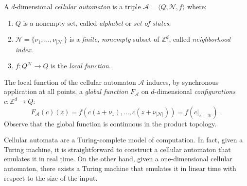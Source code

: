 \documentclass[12pt]{article}
\begin{document}
\newcommand{\Acal}{\ensuremath{\mathcal{A}}}
\newcommand{\Neigh}{\ensuremath{\mathcal{N}}}
\newcommand{\restrict}[2]{\left.{#1}\right|_{#2}}
\newcommand{\Zset}{\ensuremath{\mathbb{Z}}}

A $d$-dimensional \emph{cellular automaton}
is a triple
\begin{math}
\Acal = \langle Q,\Neigh,f \rangle
\end{math}
where:
\begin{enumerate}
\item
$Q$ is a nonempty set, called \emph{alphabet} or \emph{set of states}.
\label{it:ca-states}
\item
\begin{math}
\Neigh = \{ \nu_1, \ldots, \nu_{|\Neigh|} \}
\end{math}
is a \emph{finite, nonempty} subset of $\Zset^d$,
called \emph{neighborhood index}.
\label{it:ca-neigh}
\item
$f : Q^\Neigh \to Q$ is the \emph{local function}.
\label{it:ca-loc}
\end{enumerate}
The local function of the cellular automaton $\Acal$
induces, by synchronous application at all points,
a \emph{global function} $F_\Acal$
on $d$-dimensional \emph{configurations} $c : \Zset^d \to Q$:
\begin{equation} \label{eq:ca-glob}
F_\Acal(c)(z)
= f \left( c(z+\nu_1), \ldots, c(z+\nu_{|\Neigh|}) \right)
= f \left( \restrict{c}{z+\Neigh} \right) \;.
\end{equation}
Observe that the global function is continuous in the product topology.

\medskip

Cellular automata are a Turing-complete model of computation.
In fact, given a Turing machine,
it is straightforward to construct a cellular automaton
that emulates it in real time.
On the other hand,
given a one-dimensional cellular automaton,
there exists a Turing machine
that emulates it in linear time
with respect to the size of the input.
\end{document}
